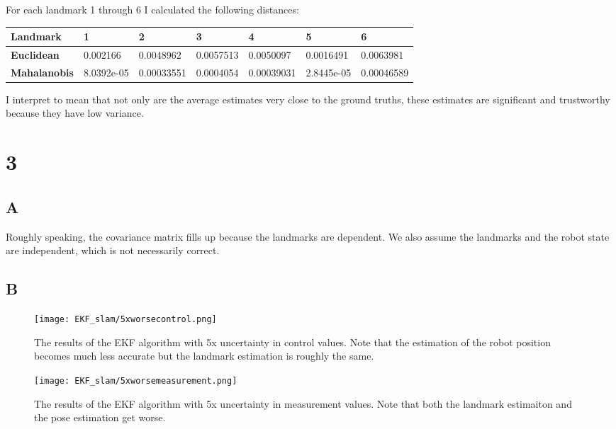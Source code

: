 \documentclass[letterpaper]{article}
\begin{document}
For each landmark 1 through 6 I calculated the following distances:
\begin{table}[H]
\centering
\begin{tabular}{|l|l|l|l|l|l|l|}
\hline
\textbf{Landmark}    & 1          & 2          & 3         & 4          & 5          & 6          \\ \hline
\textbf{Euclidean}   & 0.002166   & 0.0048962  & 0.0057513 & 0.0050097  & 0.0016491  & 0.0063981  \\ \hline
\textbf{Mahalanobis} & 8.0392e-05 & 0.00033551 & 0.0004054 & 0.00039031 & 2.8445e-05 & 0.00046589 \\ \hline
\end{tabular}
\end{table}

I interpret to mean that not only are the average estimates very close to the ground truths, these estimates are significant 
and trustworthy because they have low variance.

\section*{3}
\subsection*{A}
Roughly speaking, the covariance matrix fills up because the landmarks are dependent. We also assume the landmarks
and the robot state are independent, which is not necessarily correct. 

\subsection*{B}
\begin{figure}[H]
    \texttt{[image: EKF\_slam/5xworsecontrol.png]}
    \caption{The results of the EKF algorithm with 5x uncertainty in control values. Note that the estimation of the robot position becomes much less accurate but the landmark estimation is roughly the same.}

\end{figure}
\begin{figure}[H]
    \texttt{[image: EKF\_slam/5xworsemeasurement.png]}
    \caption{The results of the EKF algorithm with 5x uncertainty in measurement values. Note that both the landmark estimaiton and the pose estimation get worse.}

\end{figure}
\end{document}

